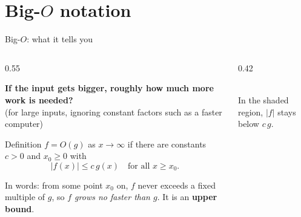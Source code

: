 \documentclass[aspectratio=169]{beamer}
\begin{document}
\section{Big-$O$ notation}

\begin{frame}{Big-$O$: what it tells you}
\begin{columns}[c]
\begin{column}{0.55\textwidth}
\small
\begin{block}{}
\centering \textbf{If the input gets bigger, roughly how much more work is needed?}\\
\scriptsize (for large inputs, ignoring constant factors such as a faster computer)
\end{block}
\begin{block}{Definition}
$f = O(g)$ as $x \to \infty$ if there are constants $c > 0$ and $x_0 \ge 0$ with
\[ |f(x)| \le c\, g(x) \quad \text{for all } x \ge x_0. \]
\end{block}
\scriptsize In words: from some point $x_0$ on, $f$ never exceeds a fixed multiple of $g$, so \emph{$f$ grows no faster than $g$}. It is an \textbf{upper bound}.
\end{column}
\begin{column}{0.42\textwidth}
\centering
{}\\[2pt]
\scriptsize In the shaded region, $|f|$ stays below $c\,g$.
\end{column}
\end{columns}
\end{frame}
\end{document}
